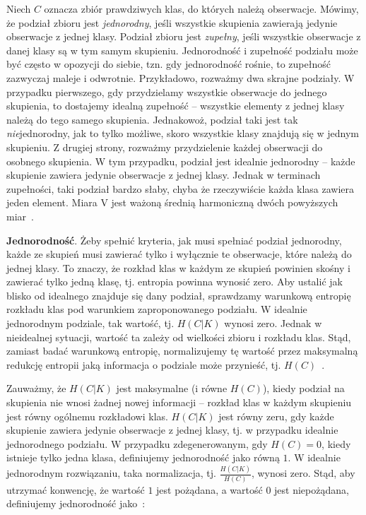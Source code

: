 \documentclass{praca1}
\begin{document}
Niech $C$ oznacza zbiór prawdziwych klas, do których należą obserwacje. Mówimy, że podział zbioru jest \emph{jednorodny}, jeśli wszystkie skupienia zawierają jedynie obserwacje z jednej klasy. Podział zbioru jest \emph{zupełny}, jeśli wszystkie obserwacje z danej klasy są w tym samym skupieniu. Jednorodność i zupełność podziału może być często w opozycji do siebie, tzn. gdy jednorodność rośnie, to zupełność zazwyczaj maleje i odwrotnie. Przykładowo, rozważmy dwa skrajne podziały. W przypadku pierwszego, gdy przydzielamy wszystkie obserwacje do jednego skupienia, to dostajemy idealną zupełność -- wszystkie elementy z jednej klasy należą do tego samego skupienia. Jednakowoż, podział taki jest tak \emph{nie}jednorodny, jak to tylko możliwe, skoro wszystkie klasy znajdują się w jednym skupieniu. Z drugiej strony, rozważmy przydzielenie każdej obserwacji do osobnego skupienia. W tym przypadku, podział jest idealnie jednorodny -- każde skupienie zawiera jedynie obserwacje z jednej klasy. Jednak w terminach zupełności, taki podział bardzo słaby, chyba że rzeczywiście każda klasa zawiera jeden element. Miara $\textrm{V}$ jest ważoną średnią harmoniczną dwóch powyższych miar~\cite{Rosenberg2007:vmeasure}.


\textbf{Jednorodność}. Żeby spełnić kryteria, jak musi spełniać podział jednorodny, każde ze skupień musi zawierać tylko i wyłącznie te obserwacje, które należą do jednej klasy. To znaczy, że rozkład klas w każdym ze skupień powinien skośny i zawierać tylko jedną klasę, tj. entropia powinna wynosić zero. Aby ustalić jak blisko od idealnego znajduje się dany podział, sprawdzamy warunkową entropię rozkładu klas pod warunkiem zaproponowanego podziału. W idealnie jednorodnym podziale, tak wartość, tj. $H(C|K)$ wynosi zero. Jednak w nieidealnej sytuacji, wartość ta zależy od wielkości zbioru i rozkładu klas. Stąd, zamiast badać warunkową entropię, normalizujemy tę wartość przez maksymalną redukcję entropii jaką informacja o podziale może przynieść, tj. $H(C)$~\cite{Rosenberg2007:vmeasure}.

Zauważmy, że $H(C|K)$ jest maksymalne (i równe $H(C)$), kiedy podział na skupienia nie wnosi żadnej nowej informacji -- rozkład klas w każdym skupieniu jest równy ogólnemu rozkładowi klas. $H(C|K)$ jest równy zeru, gdy każde skupienie zawiera jedynie obserwacje z jednej klasy, tj. w przypadku idealnie jednorodnego podziału. W przypadku zdegenerowanym, gdy $H(C) = 0$, kiedy istnieje tylko jedna klasa, definiujemy jednorodność jako równą $1$. W idealnie jednorodnym rozwiązaniu, taka normalizacja, tj. $\frac{H(C|K)}{H(C)}$, wynosi zero. Stąd, aby utrzymać konwencję, że wartość $1$ jest pożądana, a wartość $0$ jest niepożądana, definiujemy jednorodność jako~\cite{Rosenberg2007:vmeasure}:
\end{document}
